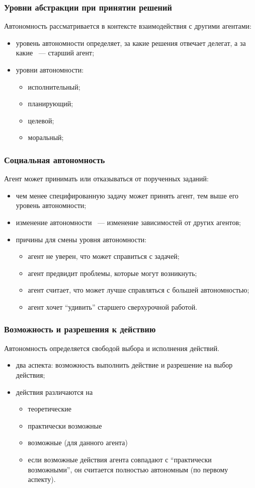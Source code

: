 \documentclass{beamer}
\begin{document}
\begin{frame}
  \frametitle{Уровни абстракции при принятии решений}
  Автономность рассматривается в контексте взаимодействия с другими агентами:
  \begin{itemize}
    \item уровень автономности определяет, за какие решения отвечает делегат, а за какие ~--- старший агент;
    \item уровни автономности:
      \begin{itemize}
        \item исполнительный;
        \item планирующий;
        \item целевой;
        \item моральный;
      \end{itemize}
  \end{itemize}
\end{frame}

\begin{frame}
  \frametitle{Социальная автономность}
  Агент может принимать или отказываться от порученных заданий:
  \begin{itemize}
    \item чем менее специфированную задачу может принять агент, тем выше его уровень автономности;
    \item изменение автономности ~--- изменение зависимостей от других агентов;
    \item причины для смены уровня автономности:
      \begin{itemize}
        \item агент не уверен, что может справиться с задачей;
        \item агент предвидит проблемы, которые могут возникнуть;
        \item агент считает, что может лучше справляться с большей автономностью;
        \item агент хочет ``удивить'' старшего сверхурочной работой.
      \end{itemize}
  \end{itemize}
\end{frame}

\begin{frame}
  \frametitle{Возможность и разрешения к действию}
  Автономность определяется свободой выбора и исполнения действий.
  \begin{itemize}
    \item два аспекта: возможность выполнить действие и разрешение на выбор действия;
    \item действия различаются на
      \begin{itemize}
        \item теоретические
        \item практически возможные
        \item возможные (для данного агента)
        \item если возможные действия агента совпадают с ``практически возможными'',
          он считается полностью автономным (по первому аспекту).
      \end{itemize}
  \end{itemize}
\end{frame}
\end{document}
